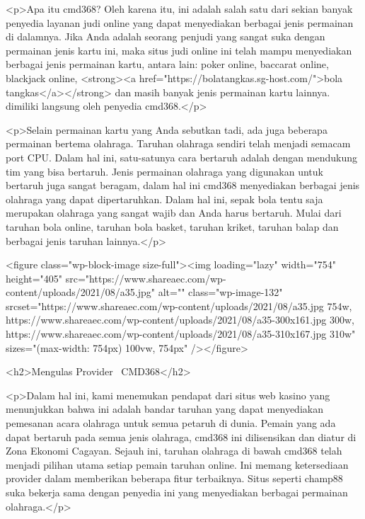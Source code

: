 <p>Apa itu cmd368? Oleh karena itu, ini adalah salah satu dari sekian banyak penyedia layanan judi online yang dapat menyediakan berbagai jenis permainan di dalamnya. Jika Anda adalah seorang penjudi yang sangat suka dengan permainan jenis kartu ini, maka situs judi online ini telah mampu menyediakan berbagai jenis permainan kartu, antara lain: poker online, baccarat online, blackjack online, <strong><a href="https://bolatangkas.sg-host.com/">bola tangkas</a></strong> dan masih banyak jenis permainan kartu lainnya. dimiliki langsung oleh penyedia cmd368.</p>



<p>Selain permainan kartu yang Anda sebutkan tadi, ada juga beberapa permainan bertema olahraga. Taruhan olahraga sendiri telah menjadi semacam port CPU. Dalam hal ini, satu-satunya cara bertaruh adalah dengan mendukung tim yang bisa bertaruh. Jenis permainan olahraga yang digunakan untuk bertaruh juga sangat beragam, dalam hal ini cmd368 menyediakan berbagai jenis olahraga yang dapat dipertaruhkan. Dalam hal ini, sepak bola tentu saja merupakan olahraga yang sangat wajib dan Anda harus bertaruh. Mulai dari taruhan bola online, taruhan bola basket, taruhan kriket, taruhan balap dan berbagai jenis taruhan lainnya.</p>



<figure class="wp-block-image size-full"><img loading="lazy" width="754" height="405" src="https://www.shareaec.com/wp-content/uploads/2021/08/a35.jpg" alt="" class="wp-image-132" srcset="https://www.shareaec.com/wp-content/uploads/2021/08/a35.jpg 754w, https://www.shareaec.com/wp-content/uploads/2021/08/a35-300x161.jpg 300w, https://www.shareaec.com/wp-content/uploads/2021/08/a35-310x167.jpg 310w" sizes="(max-width: 754px) 100vw, 754px" /></figure>



<h2>Mengulas Provider  CMD368</h2>



<p>Dalam hal ini, kami menemukan pendapat dari situs web kasino yang menunjukkan bahwa ini adalah bandar taruhan yang dapat menyediakan pemesanan acara olahraga untuk semua petaruh di dunia. Pemain yang ada dapat bertaruh pada semua jenis olahraga, cmd368 ini dilisensikan dan diatur di Zona Ekonomi Cagayan. Sejauh ini, taruhan olahraga di bawah cmd368 telah menjadi pilihan utama setiap pemain taruhan online. Ini memang ketersediaan provider dalam memberikan beberapa fitur terbaiknya. Situs seperti champ88 suka bekerja sama dengan penyedia ini yang menyediakan berbagai permainan olahraga.</p>



